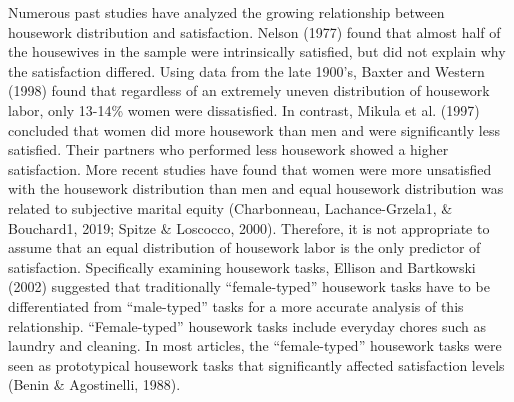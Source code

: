 \documentclass[
  man,floatsintext]{apa6}
\begin{document}
Numerous past studies have analyzed the growing relationship between housework distribution and satisfaction. Nelson (1977) found that almost half of the housewives in the sample were intrinsically satisfied, but did not explain why the satisfaction differed. Using data from the late 1900's, Baxter and Western (1998) found that regardless of an extremely uneven distribution of housework labor, only 13-14\% women were dissatisfied. In contrast, Mikula et al. (1997) concluded that women did more housework than men and were significantly less satisfied. Their partners who performed less housework showed a higher satisfaction. More recent studies have found that women were more unsatisfied with the housework distribution than men and equal housework distribution was related to subjective marital equity (Charbonneau, Lachance-Grzela1, \& Bouchard1, 2019; Spitze \& Loscocco, 2000). Therefore, it is not appropriate to assume that an equal distribution of housework labor is the only predictor of satisfaction. Specifically examining housework tasks, Ellison and Bartkowski (2002) suggested that traditionally ``female-typed'' housework tasks have to be differentiated from ``male-typed'' tasks for a more accurate analysis of this relationship. ``Female-typed'' housework tasks include everyday chores such as laundry and cleaning. In most articles, the ``female-typed'' housework tasks were seen as prototypical housework tasks that significantly affected satisfaction levels (Benin \& Agostinelli, 1988).
\end{document}
